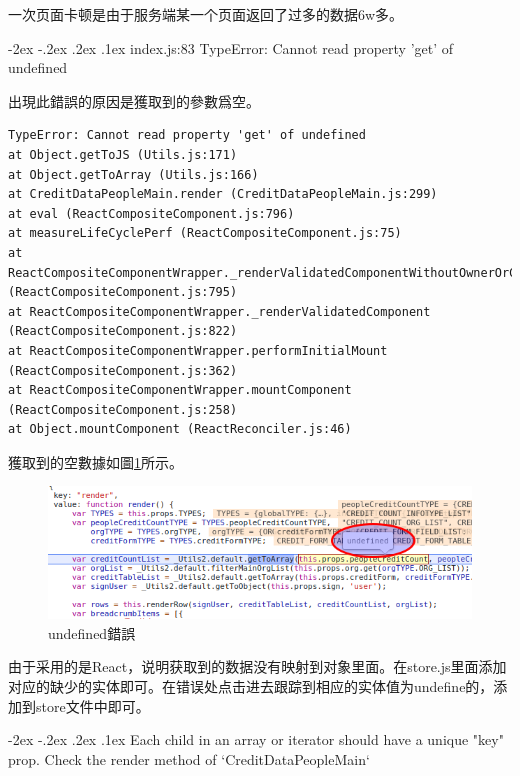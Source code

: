 \documentclass[12pt]{book}
\makeatletter
\numberwithin{dummy}{section}
\theoremstyle{ocrenumbox}
\theoremstyle{blacknumex}
\theoremstyle{blacknumbox}
\theoremstyle{ocrenum}
\renewcommand\paragraph{\@startsection{paragraph}{4}{\z@}
	{-2ex \@plus-.2ex \@minus .2ex}
	{.1ex}
	{\normalfont\small\sffamily\bfseries}}
\makeatother
\begin{document}
一次页面卡顿是由于服务端某一个页面返回了过多的数据6w多。

\paragraph{index.js:83 TypeError: Cannot read property 'get' of undefined}

出現此錯誤的原因是獲取到的參數爲空。

\begin{lstlisting}
TypeError: Cannot read property 'get' of undefined
at Object.getToJS (Utils.js:171)
at Object.getToArray (Utils.js:166)
at CreditDataPeopleMain.render (CreditDataPeopleMain.js:299)
at eval (ReactCompositeComponent.js:796)
at measureLifeCyclePerf (ReactCompositeComponent.js:75)
at ReactCompositeComponentWrapper._renderValidatedComponentWithoutOwnerOrContext (ReactCompositeComponent.js:795)
at ReactCompositeComponentWrapper._renderValidatedComponent (ReactCompositeComponent.js:822)
at ReactCompositeComponentWrapper.performInitialMount (ReactCompositeComponent.js:362)
at ReactCompositeComponentWrapper.mountComponent (ReactCompositeComponent.js:258)
at Object.mountComponent (ReactReconciler.js:46)
\end{lstlisting}

獲取到的空數據如圖\ref{fig:getundefineerror}所示。

\begin{figure}[htbp]
	\centering
	\includegraphics[scale=0.5]{getundefineerror.png}
	\caption{undefined錯誤}
	\label{fig:getundefineerror}
\end{figure}

由于采用的是React，说明获取到的数据没有映射到对象里面。在store.js里面添加对应的缺少的实体即可。在错误处点击进去跟踪到相应的实体值为undefine的，添加到store文件中即可。

\paragraph{Each child in an array or iterator should have a unique "key" prop. Check the render method of `CreditDataPeopleMain`}
\end{document}
